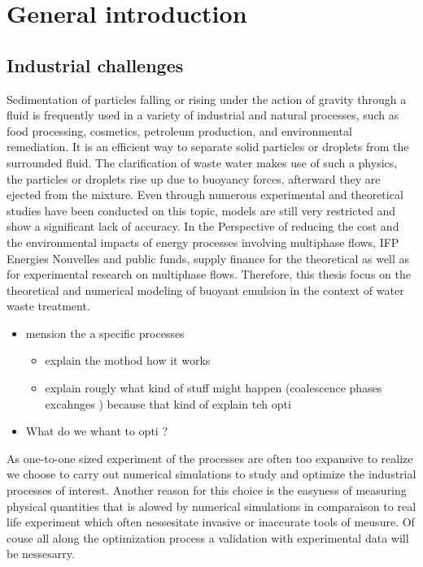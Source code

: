 \chapter{General introduction}
\label{part:intro}


\section{Industrial challenges} 


Sedimentation of particles falling or rising under the action of gravity through a fluid is frequently used in a variety of industrial and natural processes, such as food processing, cosmetics, petroleum production, and environmental remediation. 
It is an efficient way to separate solid particles or droplets from the surrounded fluid. 
The clarification of waste water makes use of such a physics, the particles or droplets rise up due to buoyancy forces, afterward they are ejected from the mixture.
Even through numerous experimental and theoretical studies have been conducted on this topic, models are still very restricted and show a significant lack of accuracy. 
In the Perspective of reducing the cost and the environmental impacts of energy processes involving multiphase flows, IFP Energies Nouvelles and public funds, supply finance for the theoretical as well as for experimental research on multiphase flows.
Therefore, this thesis focus on the theoretical and numerical modeling of buoyant emulsion in the context of water waste treatment.  

\begin{itemize}
    \item mension the a specific processes
    \begin{itemize}
        \item explain the mothod how it works 
        \item explain rougly what kind of stuff might happen (coalescence phases excahnges ) because that kind of explain teh opti
    \end{itemize}
    \item What do we whant to opti  ?
\end{itemize}

As one-to-one sized experiment of the processes are often too expansive to realize we choose to carry out numerical simulations to study and optimize the industrial processes of interest.
Another reason for this choice is the easyness of measuring physical quantities that is alowed by numerical simulations in comparaison to real life experiment which often nessesitate invasive or inaccurate tools of meusure. 
Of couse all along the optimization process a validation with experimental data will be nessesarry. 

